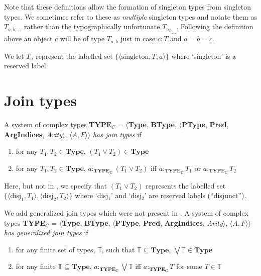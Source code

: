 Note that these definitions allow the formation of singleton types
from singleton types.  We sometimes refer to these as
\textit{multiple} singleton types and notate them as $T_{a,b,\ldots}$
rather than the typographically unfortunate ${{T_a}_b}_{\ldots}$.
Following the definition above an object $c$ will be of type $T_{a,b}$
just in case $c:T$ and $a=b=c$.

We let $T_a$ represent the labelled set
$\{\langle\mathrm{singleton},T,a\rangle\}$ where `singleton' is a reserved
label.
 
\section{Join types}
\label{app:jointypes}


A system of complex types {\bf TYPE$_C$} = $\langle${\bf Type}, {\bf BType},
$\langle$\textbf{PType}, {\bf Pred}, \textbf{ArgIndices}, {\it
  Arity\/}$\rangle$, $\langle A,F\rangle$$\rangle$ \textit{has join
  types} if 

\begin{enumerate} 
 
\item for any $T_1,T_2 \in \mathbf{Type}$, $(T_1\vee T_2) \in \mathbf{Type}$ 
 
\item for any $T_1,T_2 \in \mathbf{Type}$, $a:_{\mathbf{TYPE_C}}(T_1\vee T_2)$ iff
  $a:_{\mathbf{TYPE_C}}T_1$ or $a:_{\mathbf{TYPE_C}}T_2$ 
 
\end{enumerate}

Here, but not in \cite{Cooper2012}, we specify that $(T_1\vee T_2)$
represents the labelled set
$\{\langle\mathrm{disj}_1,T_1\rangle,\langle\mathrm{disj_2},T_2\rangle\}$
where `disj$_1$' and `disj$_2$' are reserved labels (``disjunct'').

We add generalized join types which were not present in
\cite{Cooper2012}.  A system of complex types {\bf TYPE$_C$} = $\langle${\bf Type}, {\bf BType},
$\langle$\textbf{PType}, {\bf Pred}, \textbf{ArgIndices}, {\it
  Arity\/}$\rangle$, $\langle A,F\rangle$$\rangle$ \textit{has
  generalized join
  types} if 

\begin{enumerate} 
 
\item for any finite set of types, $\mathbb{T}$, such that $\mathbb{T}
  \subseteq\mathbf{Type}$, $\bigvee\mathbb{T} \in \mathbf{Type}$ 
 
\item for any finite $\mathbb{T} \subseteq\mathbf{Type}$, $a:_{\mathbf{TYPE_C}}\bigvee\mathbb{T}$ iff
  $a:_{\mathbf{TYPE_C}}T$ for some $T\in\mathbb{T}$
 
\end{enumerate}

